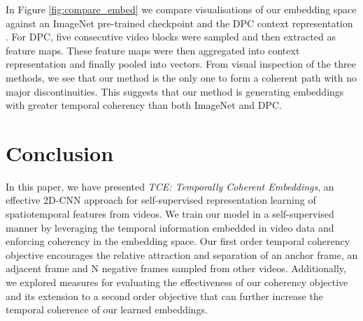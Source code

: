 \documentclass[a4paper,conference]{IEEEtran}
\begin{document}
\begin{figure*}[h]
  \caption{A comparison between frame embeddings generated with (a) \textit{TCE}; (b) ImageNet Pre-Training; and (c) DPC~\cite{han2019video}.}
  \label{fig:compare_embed}
\end{figure*}

In Figure \ref{fig:compare_embed} we compare visualisations of our embedding space against an ImageNet pre-trained checkpoint and the DPC context representation \cite{han2019video}. For DPC, five consecutive video blocks were sampled and then extracted as feature maps. These feature maps were then aggregated into context representation and finally pooled into vectors. From visual inspection of the three methods, we see that our method is the only one to form a coherent path with no major discontinuities. This suggests that our method is generating embeddings with greater temporal coherency than both ImageNet and DPC.








 \label{sec: Conclusion}
\section{Conclusion}

In this paper, we have presented \textit{TCE: Temporally Coherent Embeddings}, an effective 2D-CNN approach for self-supervised representation learning of spatiotemporal features from videos. We train our model in a self-supervised manner by leveraging the temporal information embedded in video data and enforcing coherency in the embedding space. Our first order temporal coherency objective encourages the relative attraction and separation of an anchor frame, an adjacent frame and N negative frames sampled from other videos. Additionally, we explored measures for evaluating the effectiveness of our coherency objective and its extension to a second order objective that can further increase the temporal coherence of our learned embeddings.
\end{document}
